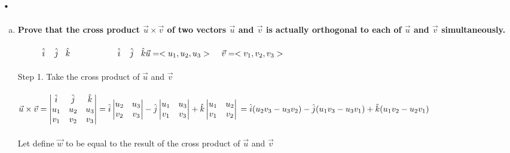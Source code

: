\documentclass{article}
\begin{document}
\section{.}
\begin{enumerate}[a.]
\item \textbf{Prove that the cross product $\vec{u} \times \vec{v}$ of two vectors $\vec{u}$ and $\vec{v}$ is actually orthogonal to each of $\vec{u}$ and $\vec{v}$ simultaneously.}\\
\\

$\hspace{1cm}\hat{i}\hspace{.4cm}\hat{j}\hspace{.3cm}\hat{k}\hspace{2cm}\hat{i}\hspace{.4cm}\hat{j}\hspace{.3cm}\hat{k}\\\vec{u} = <u_{1},u_{2},u_{3}>\hspace{.4cm}\vec{v} = <v_{1},v_{2},v_{3}>$\\
\\
Step 1. Take the cross product of $\vec{u}$ and $\vec{v}$\\
\\
$\vec{u}\times\vec{v}=\begin{vmatrix}
\hat{i}&\hat{j}&\hat{k}\\
u_{1}&u_{2}&u_{3}\\
v_{1}&v_{2}&v_{3}\\
\end{vmatrix}=\hat{i}
\begin{vmatrix}
u_{2}&u_{3}\\
v_{2}&v_{3}\\
\end{vmatrix}-\hat{j}\begin{vmatrix}
u_{1}&u_{3}\\
v_{1}&v_{3}\\
\end{vmatrix}+\hat{k}\begin{vmatrix}
u_{1}&u_{2}\\
v_{1}&v_{2}\\
\end{vmatrix}\\
=\hat{i}(u_{2}v_{3}-u_{3}v_{2})-\hat{j}(u_{1}v_{3}-u_{3}v_{1})+\hat{k}(u_{1}v_{2}-u_{2}v_{1})$\\
\\
Let define $\vec{w}$ to be equal to the result of the cross product of $\vec{u}$ and $\vec{v}$\\

\end{enumerate}
\end{document}
